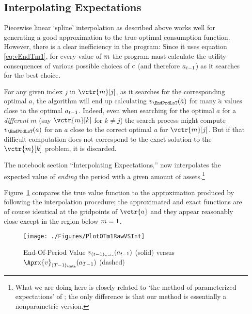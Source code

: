 \documentclass[SolvingMicroDSOPs]{subfiles}
\begin{document}
\hypertarget{interpolating-expectations}{}
\subsection{Interpolating Expectations}


Piecewise linear `spline' interpolation as described above works well for generating a good approximation to the true optimal consumption function. However, there is a clear inefficiency in the program: Since it uses equation \eqref{eq:vEndTm1}, for every value of $m$ the program must calculate the utility consequences of various possible choices of $c$ (and therefore $a_{t-1}$) as it searches for the best choice.

For any given index $j$ in $\vctr{m}[j]$, as it searches for the corresponding optimal $a$, the algorithm will end up  calculating $\vFunc_{\EndPrdLsT}(\tilde{a})$ for many $\tilde{a}$ values close to the optimal $a_{t-1}$.  Indeed, even when searching for the optimal $a$ for a \emph{different} $m$ (say $\vctr{m}[k]$ for $k \neq j$) the search process might compute $\vFunc_{\EndPrdLsT}(a)$ for an $a$ close to the correct optimal $a$ for $\vctr{m}[j]$. But if that difficult computation does not correspond to the exact solution to the $\vctr{m}[k]$ problem, it is discarded.  


The notebook section ``Interpolating Expectations,'' now interpolates the expected value of \textit{ending} the period with a given amount of assets.\footnote{What we are doing here is closely related to `the method of parameterized expectations' of \cite{denHaanMarcet:parameterized}; the only difference is that our method is essentially a nonparametric version.}  %

Figure~\ref{fig:PlotOTm1RawVSInt} compares the true value function to the approximation produced by following the interpolation procedure; the approximated and exact functions are of course identical at the gridpoints of $\vctr{a}$ and they appear reasonably close except in the region below $m=1$.

\hypertarget{PlotOTm1RawVSInt}{}
\begin{figure}
  \centerline{\texttt{[image: ./Figures/PlotOTm1RawVSInt]}}
  \caption{End-Of-Period Value $\vFunc_{(\prdT-1)_\cntn}(a_{\prdT-1})$ (solid) versus $\Aprx{\vFunc}_{({\trmT-1})_\cntn}(a_{\trmT-1})$ (dashed)}
  \label{fig:PlotOTm1RawVSInt}
\end{figure}
\end{document}
